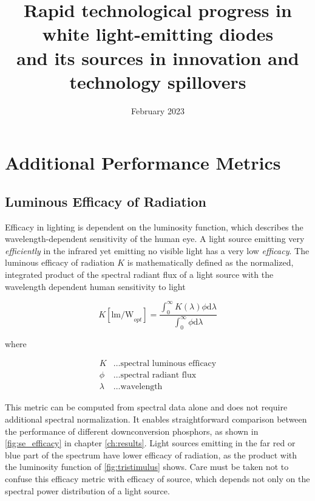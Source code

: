 \documentclass[10pt]{article}
\title{Rapid technological progress in white light-emitting diodes \\ and its sources in innovation and technology spillovers  }
\date{February 2023}
\begin{document}
\setlength{\fboxsep}{10pt}

\tableofcontents

\newpage

\section{Additional Performance Metrics}

\subsection{Luminous Efficacy of Radiation}
\label{subsec:ler}

Efficacy in lighting is dependent on the luminosity function, which describes the wavelength-dependent sensitivity of the human eye. A light source emitting very \textit{efficiently} in the infrared yet emitting no visible light has a very low \textit{efficacy}. The luminous efficacy of radiation $K$ is mathematically defined as the normalized, integrated product of the spectral radiant flux of a light source with the wavelength dependent human sensitivity to light \cite{cie-term-effrad}

\begin{equation}
\label{eqn:ler}
    K [\text{lm/W}_{opt}]= \frac{\int_0^\infty K( \lambda ) \phi \text{d} \lambda}{\int_0^\infty \phi \text{d} \lambda}
\end{equation}

where

\begin{align*}
    K &\dots \text{spectral luminous efficacy} \\
    \phi &\dots \text{spectral radiant flux} \\
    \lambda &\dots \text{wavelength}
\end{align*}

This metric can be computed from spectral data alone and does not require additional spectral normalization. It enables straightforward comparison between the performance of different downconversion phosphors, as shown in  \cref{fig:se_efficacy} in chapter \cref{ch:results}. Light sources emitting in the far red or blue part of the spectrum have lower efficacy of radiation, as the product with the luminosity function of  \cref{fig:tristimulus} shows. Care must be taken not to confuse this efficacy metric with efficacy of source, which depends not only on the spectral power distribution of a light source.
\end{document}

